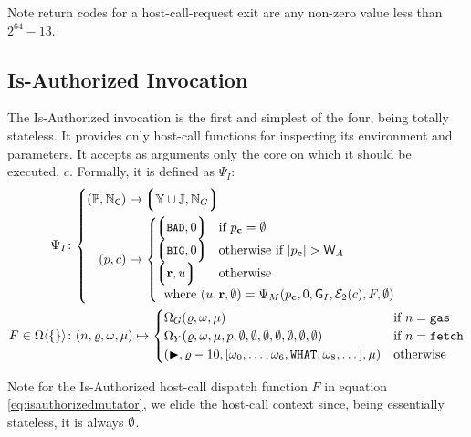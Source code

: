 Note return codes for a host-call-request exit are any non-zero value less than $2^{64} - 13$.

\subsection{Is-Authorized Invocation}\label{sec:isauthorizedinvocation}

\newcommand*{\wpX}{p}

The Is-Authorized invocation is the first and simplest of the four, being totally stateless. It provides only host-call functions for inspecting its environment and parameters. It accepts as arguments only the core on which it should be executed, $c$. Formally, it is defined as $\Psi_I$:
\begin{align}
  \Psi_I &\colon \left\{\begin{aligned}
    (\workpackage, \N_\mathsf{C}) &\to \tuple{\blob \cup \mathbb{J}, \N_G} \\
    (\wpX, c) &\mapsto \begin{cases}
      \tup{\token{BAD}, 0} &\when \wpX_\mathbf{c} = \none \\
      \tup{\token{BIG}, 0} &\otherwhen |\wpX_\mathbf{c}| > \mathsf{W}_A \\
      \tup{\mathbf{r}, u} &\otherwise \\
      \multicolumn{2}{l}{\where (u, \mathbf{r}, \none) = \Psi_M(\wpX_\mathbf{c}, 0, \mathsf{G}_I, \se_2(c), F, \none)}\\
    \end{cases}\\
  \end{aligned}\right. \\
  \label{eq:isauthorizedmutator}F \in \Omega\ang{\{\}} &\colon
    (n, \gascounter, \registers, \memory) \mapsto \begin{cases}
      \Omega_G(\gascounter, \registers, \memory) &\when n = \mathtt{gas} \\
      \Omega_Y(\gascounter, \registers, \memory, \wpX, \none, \none, \none, \none, \none, \none, \none) &\when n = \mathtt{fetch} \\
      (\continue, \gascounter - 10, [\registers_0, \dots, \registers_6, \mathtt{WHAT}, \registers_8, \dots], \memory) &\otherwise
    \end{cases}
\end{align}

Note for the Is-Authorized host-call dispatch function $F$ in equation \ref{eq:isauthorizedmutator}, we elide the host-call context since, being essentially stateless, it is always $\emptyset$.

